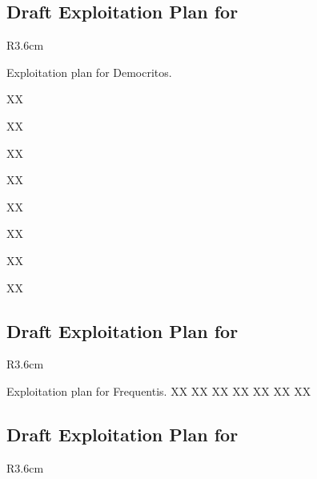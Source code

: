 \documentclass[a4paper,11pt]{article}
\begin{document}
\horizontalline

\subsection*{Draft Exploitation Plan for \DEMshort{}}
\vspace{-6pt}

\begin{wrapfigure}{R}{3.6cm}
\vspace{-1.3cm}
\hfill {}
\vspace{-0.8cm}
\end{wrapfigure}

Exploitation plan for Democritos.

XX

XX

XX

XX

XX

XX

XX

XX
\horizontalline

\subsection*{Draft Exploitation Plan for \FRQshort{}}
\vspace{-6pt}

\begin{wrapfigure}{R}{3.6cm}
\vspace{-1.3cm}
\hfill {}
\vspace{-0.8cm}
\end{wrapfigure}

Exploitation plan for Frequentis.
XX
XX
XX
XX
XX
XX
XX

\horizontalline

\subsection*{Draft Exploitation Plan for \YAGshort{}}
\vspace{-6pt}

\begin{wrapfigure}{R}{3.6cm}
\vspace{-1.3cm}
\hfill {}
\vspace{-0.8cm}
\end{wrapfigure}
\end{document}
